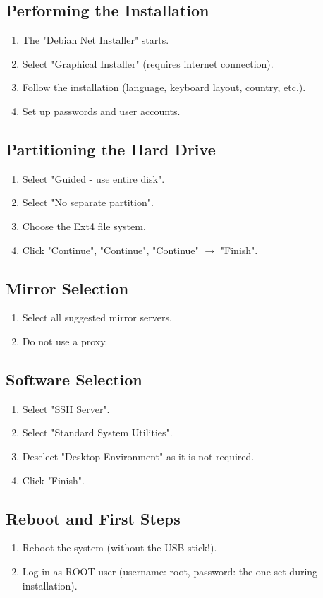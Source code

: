 \documentclass[a4paper,12pt]{article}
\begin{document}
\subsection{Performing the Installation}
\begin{enumerate}
\item The "Debian Net Installer" starts.
\item Select "Graphical Installer" (requires internet connection).
\item Follow the installation (language, keyboard layout, country, etc.).
\item Set up passwords and user accounts.
\end{enumerate}

\subsection{Partitioning the Hard Drive}
\begin{enumerate}
\item Select "Guided - use entire disk".
\item Select "No separate partition".
\item Choose the Ext4 file system.
\item Click "Continue", "Continue", "Continue" $\rightarrow$ "Finish".
\end{enumerate}

\subsection{Mirror Selection}
\begin{enumerate}
\item Select all suggested mirror servers.
\item Do not use a proxy.
\end{enumerate}

\subsection{Software Selection}
\begin{enumerate}
\item Select "SSH Server".
\item Select "Standard System Utilities".
\item Deselect "Desktop Environment" as it is not required.
\item Click "Finish".
\end{enumerate}

\subsection{Reboot and First Steps}
\begin{enumerate}
\item Reboot the system (without the USB stick!).
\item Log in as ROOT user (username: root, password: the one set during installation).
\end{enumerate}
\end{document}
